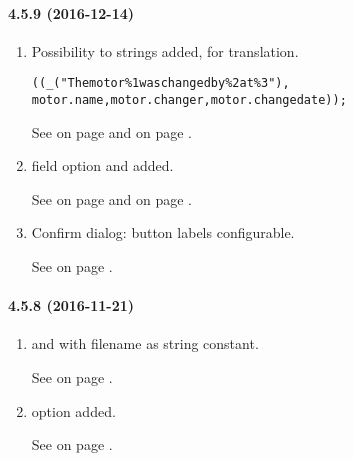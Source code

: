 \paragraph{4.5.9 (2016-12-14)}
\begin{enumerate}

\item Possibility to \COMPOSE{} strings added, for translation. \\
  \begin{boxedminipage}[t]{\linewidth}
    \begin{alltt}
\MESSAGEBOX( \COMPOSE( _("The motor \%1 was changed by \%2 at \%3"),
                       motor.name, motor.changer, motor.changedate) );
    \end{alltt}
  \end{boxedminipage}

  See  on page \pageref{dia:functionexpression}
  and  on page \pageref{dia:datastatement}.

\item \FIELDGROUP{} field option \VERTICAL{} and \ROTATEONEEIGHTY{} added.

  See  on page \pageref{dia:uifieldadditionalattributes}
  and  on page \pageref{dia:uifieldoptions}.

\item Confirm dialog: button labels configurable.

  See  on page \pageref{dia:jobconfirmoption}.


\end{enumerate}
\paragraph{4.5.8 (2016-11-21)}
\begin{enumerate}

\item \OPEN{} and \SAVE{} with filename as string constant.

  See  on page \pageref{dia:filestatement}.

\item \TABLE{} option \FUNC{} added.

  See  on page \pageref{dia:uitbloption}.

\end{enumerate}
